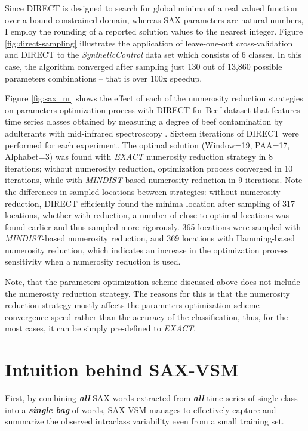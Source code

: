 Since DIRECT is designed to search for global minima of a real valued function over a bound constrained domain, 
whereas SAX parameters are natural numbers, I employ the rounding of a reported solution values to the nearest integer.
Figure \ref{fig:direct-sampling} illustrates the application of leave-one-out cross-validation and DIRECT to the
\textit{SyntheticControl} data set \cite{ucr} which consists of 6 classes. 
In this case, the algorithm converged after sampling just 130 out of 13,860 possible parameters combinations -- 
that is over 100x speedup.

Figure \ref{fig:sax_nr} shows the effect of each of the numerosity reduction strategies on parameters optimization
process with DIRECT for Beef dataset that features time series classes obtained by measuring a degree of beef contamination 
by adulterants with mid-infrared spectroscopy \cite{citeulike:12859637}. 
Sixteen iterations of DIRECT were performed for each experiment. 
The optimal solution (Window=19, PAA=17, Alphabet=3) was found with \textit{EXACT} numerosity reduction strategy 
in 8 iterations; without numerosity reduction, optimization process converged in 10 iterations, while 
with \mbox{\textit{MINDIST}-based} numerosity reduction in 9 iterations. 
Note the differences in sampled locations between strategies: without numerosity reduction, DIRECT efficiently found 
the minima location after sampling of 317 locations, whether with reduction, a number of close to optimal locations was 
found earlier and thus sampled more rigorously. 
365 locations were sampled with \mbox{\textit{MINDIST}-based} numerosity reduction, and 369 locations with Hamming-based 
numerosity reduction, which indicates an increase in the optimization process sensitivity when a numerosity reduction is used.

Note, that the parameters optimization scheme discussed above does not include the numerosity reduction strategy.
The reasons for this is that the numerosity reduction strategy mostly affects the parameters optimization scheme 
convergence speed rather than the accuracy of the classification, thus, for the most cases, it can be simply pre-defined 
to \textit{EXACT}.

\section{Intuition behind SAX-VSM}
First, by combining \textit{\textbf{all}} SAX words extracted from 
\textit{\textbf{all}} time series of single class into a \textit{\textbf{single bag}} of 
words, SAX-VSM manages to effectively capture and summarize the observed intraclass variability 
even from a small training set.  

